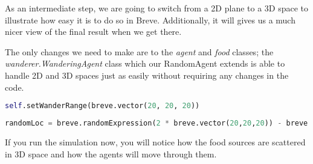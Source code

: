 As an intermediate step, we are going to switch from a 2D plane to a 3D space to illustrate how easy it is to do so in Breve. Additionally, it will gives us a much nicer view of the final result when we get there. 

The only changes we need to make are to the \textit{agent} and \textit{food} classes; the \textit{wanderer.WanderingAgent} class which our RandomAgent extends is able to handle 2D and 3D spaces just as easily without requiring any changes in the code. 


\begin{fullwidth}
\begin{lstlisting}[language=Python]
self.setWanderRange(breve.vector(20, 20, 20))
\end{lstlisting}
\end{fullwidth}


\begin{fullwidth}
\begin{lstlisting}[language=Python]
randomLoc = breve.randomExpression(2 * breve.vector(20,20,20)) - breve.vector(20,20,20)
\end{lstlisting}
\end{fullwidth}

If you run the simulation now, you will notice how the food sources are scattered in 3D space and how the agents will move through them.